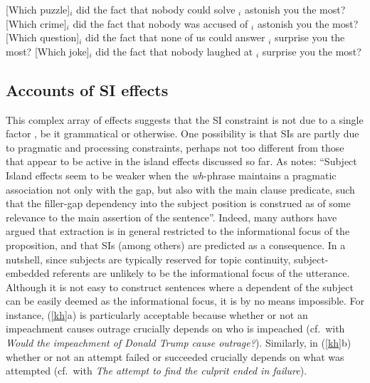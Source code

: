\documentclass[output=paper
 	        ,biblatex
                ,babelshorthands
                ,newtxmath
                ,draftmode
                ,colorlinks, citecolor=brown
]{langscibook}
\begin{document}
\eal \label{excz}
\ex {}[Which puzzle]$_i$ did the fact that nobody could solve \trace$_i$ astonish you the most?
\ex {}[Which crime]$_i$ did the fact that nobody was accused of \trace$_i$ astonish you the most?
\ex {}[Which question]$_i$ did the fact that none of us could answer \trace$_i$  surprise you the most?
\ex {}[Which joke]$_i$ did the fact that nobody laughed at \trace$_i$ surprise you the most?
\zl

\subsection{Accounts of SI effects}

This complex array of effects suggests that the SI constraint is not due to a single factor
\citep{chomsky08,chavessubj,fernandez}, be it grammatical or otherwise.  One possibility is that SIs
are partly due to pragmatic and processing constraints, perhaps not too different from those that
appear to be active in the island effects discussed so far. As \citet[495]{kluender06} notes:
``Subject Island effects seem to be weaker when the \emph{wh}-phrase maintains a pragmatic
association not only with the gap, but also with the main clause predicate, such that the filler-gap
dependency into the subject position is construed as of some relevance to the main assertion of the
sentence''. Indeed, many authors \citep{shir-jrn,valin86,kuno87,ken,Dean,goldberg13} have argued
that extraction is in general restricted to the informational focus of the proposition, and that SIs
(among others) are predicted as a consequence. In a nutshell, since subjects are typically reserved
for topic continuity, subject-embedded referents are unlikely to be the informational focus of the
utterance.  Although it is not easy to construct sentences where a dependent of the subject can be
easily deemed as the informational focus, it is by no means impossible.  For instance, (\ref{kh}a)
is particularly acceptable because whether or not an impeachment causes outrage crucially depends on
who is impeached (cf.\ with \emph{Would the impeachment of Donald Trump cause outrage?}). Similarly,
in (\ref{kh}b) whether or not an attempt failed or succeeded crucially depends on what was attempted
(cf.\ with \emph{The attempt to find the culprit ended in failure}).
\end{document}
